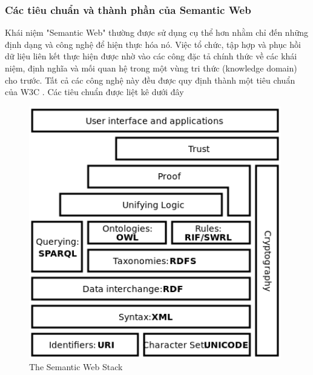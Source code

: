 \subsubsection{Các tiêu chuẩn và thành phần của Semantic Web}
Khái niệm "Semantic Web" thường được sử dụng cụ thể hơn nhằm chỉ đến những định dạng và công nghệ để hiện thực hóa nó. Việc tổ chức, tập hợp và phục hồi dữ liệu liên kết thực hiện được nhờ vào các công đặc tả chính thức về các khái niệm, định nghĩa và mối quan hệ trong một vùng tri thức (knowledge domain) cho trước. Tất cả các công nghệ này đều được quy định thành một tiêu chuẩn của W3C \cite{semantic2}. Các tiêu chuẩn được liệt kê dưới đây
\begin{figure}[h!]
	\centering
	\includegraphics[width=110mm]{Figures/semantic_web_stack.png}
	\caption{The Semantic Web Stack \label{overflow}}
\end{figure}
